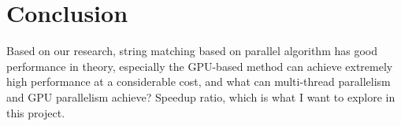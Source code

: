 \documentclass[11pt]{article}       %
\begin{document}

\section{Conclusion} \label{Conclu}

Based on our research, string matching based on parallel algorithm has good performance in theory, especially the GPU-based method can achieve extremely high performance at a considerable cost, and what can multi-thread parallelism and GPU parallelism achieve? Speedup ratio, which is what I want to explore in this project.



%
\end{document}
